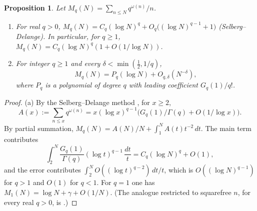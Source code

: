 \documentclass[11pt]{amsart}
\newtheorem{proposition}[theorem]{Proposition}
\theoremstyle{definition}
\theoremstyle{remark}
\newcommand{\half}{\tfrac12}
\newcommand{\om}{\omega}
\begin{document}
\begin{proposition}\label{prop:Mk}
  Let $M_q(N) = \sum_{n\le N}q^{\om(n)}/n$.
  \begin{enumerate}
  \item[(a)] For real $q>0$, $M_q(N)=C_q(\log N)^q+O_q\bigl((\log N)^{q-1}+1\bigr)$
    (Selberg--Delange).  In particular, for $q\ge1$,
    $M_q(N)=C_q(\log N)^q(1+O(1/\log N))$.
  \item[(b)] For integer $q\ge1$ and every $\delta<\min(\half,1/q)$,
    \[
      M_q(N) = P_q(\log N) + O_{q,\delta}(N^{-\delta}),
    \]
    where $P_q$ is a polynomial of degree $q$ with leading coefficient $G_q(1)/q!$.
  \end{enumerate}
\end{proposition}
\begin{proof}
  (a) By the Selberg--Delange method \cite[Ch.~II.5]{SD}, for $x\ge2$,
  \[
    A(x):=\sum_{n\le x}q^{\om(n)}=x(\log x)^{q-1}\bigl(G_q(1)/\Gamma(q)+O(1/\log x)\bigr).
  \]
  By partial summation, $M_q(N)=A(N)/N+\int_1^NA(t)t^{-2}\,dt$.  The main term
  contributes
  \[
    \int_2^N\frac{G_q(1)}{\Gamma(q)}(\log t)^{q-1}\,\frac{dt}t=C_q(\log N)^q+O(1),
  \]
  and the error
  contributes $\int_2^NO((\log t)^{q-2})\,dt/t$, which is $O((\log N)^{q-1})$ for $q>1$
  and $O(1)$ for $q<1$.  For $q=1$ one has $M_1(N)=\log N+\gamma+O(1/N)$.  (The analogue
  restricted to squarefree $n$, for every real $q>0$, is \cite[Thm.~3.2(b)]{P05}.)


\end{proof}
\end{document}
